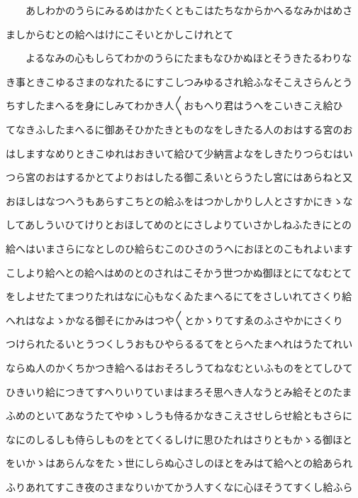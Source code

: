 \documentclass[a4paper,11pt,landscape]{ltjtarticle}
\begin{document}
\par\medskip
　　あしわかのうらにみるめはかたくともこはたちなからかへるなみかはめさ
\par\medskip
ましからむとの給へはけにこそいとかしこけれとて
\par\medskip
　　よるなみの心もしらてわかのうらにたまもなひかぬほとそうきたるわりな
\par\medskip
き事ときこゆるさまのなれたるにすこしつみゆるされ給ふなそこえさらんとう
\par\medskip
ちすしたまへるを身にしみてわかき人〱おもへり君はうへをこいきこえ給ひ
\par\medskip
てなきふしたまへるに御あそひかたきとものなをしきたる人のおはする宮のお
\par\medskip
はしますなめりときこゆれはおきいて給ひて少納言よなをしきたりつらむはい
\par\medskip
つら宮のおはするかとてよりおはしたる御こゑいとらうたし宮にはあらねと又
\par\medskip
おほしはなつへうもあらすこちとの給ふをはつかしかりし人とさすかにきゝな
\par\medskip
してあしういひてけりとおほしてめのとにさしよりていさかしねふたきにとの
\par\medskip
給へはいまさらになとしのひ給らむこのひさのうへにおほとのこもれよいます
\par\medskip
こしより給へとの給へはめのとのされはこそかう世つかぬ御ほとにてなむとて
\par\medskip
をしよせたてまつりたれはなに心もなくゐたまへるにてをさしいれてさくり給
\par\medskip
へれはなよゝかなる御そにかみはつや〱とかゝりてすゑのふさやかにさくり
\par\medskip
つけられたるいとうつくしうおもひやらるるてをとらへたまへれはうたてれい
\par\medskip
ならぬ人のかくちかつき給へるはおそろしうてねなむといふものをとてしひて
\par\medskip
ひきいり給につきてすへりいりていまはまろそ思へき人なうとみ給そとのたま
\par\medskip
ふめのといてあなうたてやゆゝしうも侍るかなきこえさせしらせ給ともさらに
\par\medskip
なにのしるしも侍らしものをとてくるしけに思ひたれはさりともかゝる御ほと
\par\medskip
をいかゝはあらんなをたゝ世にしらぬ心さしのほとをみはて給へとの給あられ
\par\medskip
ふりあれてすこき夜のさまなりいかてかう人すくなに心ほそうてすくし給ふら
\par\medskip
\end{document}
